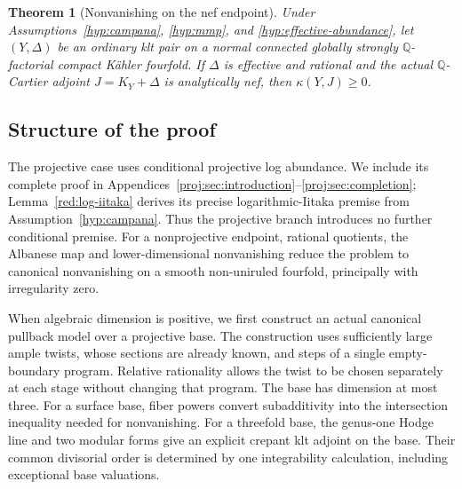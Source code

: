 \documentclass[11pt,letterpaper]{article}
\newcommand{\Q}{\mathbb{Q}}
\newtheorem{theorem}{Theorem}[section]
\theoremstyle{definition}
\theoremstyle{remark}
\begin{document}
\begin{theorem}[Nonvanishing on the nef endpoint]
\label{thm:nonvanishing}
Under Assumptions~\ref{hyp:campana}, \ref{hyp:mmp}, and
\ref{hyp:effective-abundance}, let \((Y,\Delta)\) be an ordinary
klt pair on a normal connected globally strongly
\(\Q\)-factorial compact K\"ahler fourfold. If \(\Delta\)
is effective and rational and the actual \(\Q\)-Cartier adjoint
\(J=K_Y+\Delta\) is analytically nef, then
\(\kappa(Y,J)\ge0\).
\end{theorem}

\subsection{Structure of the proof}

The projective case uses conditional projective log abundance. We
include its complete proof in
Appendices~\ref{proj:sec:introduction}--\ref{proj:sec:completion};
Lemma~\ref{red:log-iitaka} derives its precise logarithmic-Iitaka
premise from Assumption~\ref{hyp:campana}. Thus the projective
branch introduces no further conditional premise. For a
nonprojective endpoint, rational quotients, the Albanese map and
lower-dimensional nonvanishing reduce the problem to canonical
nonvanishing on a smooth non-uniruled fourfold, principally with
irregularity zero.

When algebraic dimension is positive, we first construct an actual
canonical pullback model over a projective base. The construction
uses sufficiently large ample twists, whose sections are already
known, and steps of a single empty-boundary program. Relative
rationality allows the twist to be chosen separately at each stage
without changing that program. The base has dimension at most three.
For a surface base, fiber powers convert subadditivity into the
intersection inequality needed for nonvanishing. For a threefold
base, the genus-one Hodge line and two modular forms give an
explicit crepant klt adjoint on the base. Their common divisorial
order is determined by one integrability calculation, including
exceptional base valuations.
\end{document}
